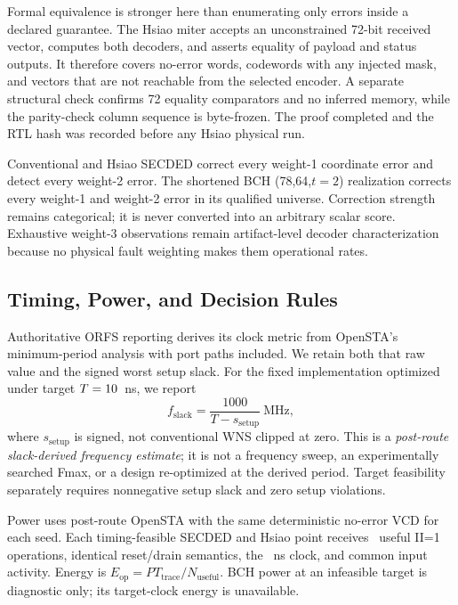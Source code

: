 Formal equivalence is stronger here than enumerating only errors inside a declared guarantee. The Hsiao miter accepts an unconstrained 72-bit received vector, computes both decoders, and asserts equality of payload and status outputs. It therefore covers no-error words, codewords with any injected mask, and vectors that are not reachable from the selected encoder. A separate structural check confirms 72 equality comparators and no inferred memory, while the parity-check column sequence is byte-frozen. The proof completed and the RTL hash was recorded before any Hsiao physical run.

Conventional and Hsiao SECDED correct every weight-1 coordinate error and detect every weight-2 error. The shortened BCH (78,64,$t=2$) realization corrects every weight-1 and weight-2 error in its qualified universe. Correction strength remains categorical; it is never converted into an arbitrary scalar score. Exhaustive weight-3 observations remain artifact-level decoder characterization because no physical fault weighting makes them operational rates.



\subsection{Timing, Power, and Decision Rules}

Authoritative ORFS reporting derives its clock metric from OpenSTA's minimum-period analysis with port paths included. We retain both that raw value and the signed worst setup slack. For the fixed implementation optimized under target $T=10$~ns, we report
\begin{equation}
 f_{\mathrm{slack}}=\frac{1000}{T-s_{\mathrm{setup}}}\ \mathrm{MHz},
 \label{eq:fslack}
\end{equation}
where $s_{\mathrm{setup}}$ is signed, not conventional WNS clipped at zero. This is a \emph{post-route slack-derived frequency estimate}; it is not a frequency sweep, an experimentally searched Fmax, or a design re-optimized at the derived period. Target feasibility separately requires nonnegative setup slack and zero setup violations.

Power uses post-route OpenSTA with the same deterministic no-error VCD for each seed. Each timing-feasible SECDED and Hsiao point receives \PowerOperations\ useful II=1 operations, identical reset/drain semantics, the \ClockPeriodNs~ns clock, and common input activity. Energy is $E_{\mathrm{op}}=P T_{\mathrm{trace}}/N_{\mathrm{useful}}$. BCH power at an infeasible target is diagnostic only; its target-clock energy is unavailable.

